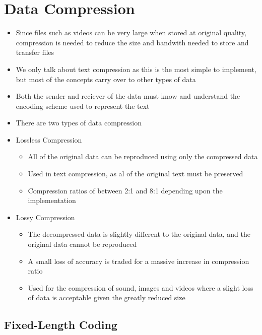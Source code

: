 \section*{Data Compression}

\begin{itemize}
  \item Since files such as videos can be very large when stored at original quality, compression is needed to reduce the size and bandwith needed to store and transfer files
  \item We only talk about text compression as this is the most simple to implement, but most of the concepts carry over to other types of data
  \item Both the sender and reciever of the data must know and understand the encoding scheme used to represent the text
  \item There are two types of data compression
  \item Lossless Compression
  \begin{itemize}
    \item All of the original data can be reproduced using only the compressed data
    \item Used in text compression, as al of the original text must be preserved
    \item Compression ratios of between 2:1 and 8:1 depending upon the implementation
  \end{itemize}
  \item Lossy Compression
  \begin{itemize}
    \item The decompressed data is slightly different to the original data, and the original data cannot be reproduced
    \item A small loss of accuracy is traded for a massive increase in compression ratio
    \item Used for the compression of sound, images and videos where a slight loss of data is acceptable given the greatly reduced size
  \end{itemize}
\end{itemize}

\subsection*{Fixed-Length Coding}

